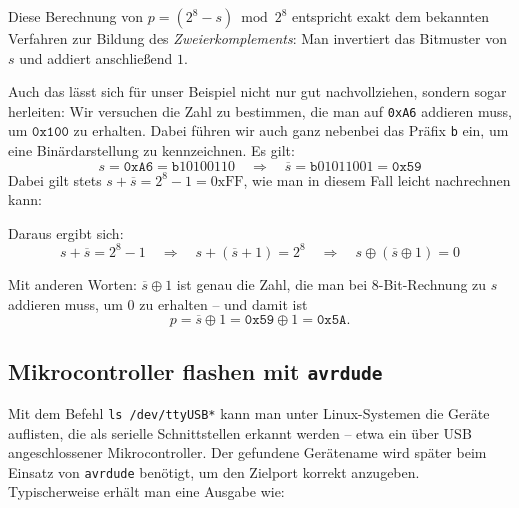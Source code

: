 \documentclass[a4paper,12pt]{article}
\begin{document}
\begin{enumerate}
	Diese Berechnung von $p = (2^8 - s) \bmod 2^8$ entspricht exakt dem
	bekannten Verfahren zur Bildung des \emph{Zweierkomplements}:  Man
	invertiert das Bitmuster von $s$ und addiert anschließend $1$.

	Auch das lässt sich für unser Beispiel nicht nur gut nachvollziehen,
	sondern sogar herleiten:  Wir versuchen die Zahl zu bestimmen, die man
	auf \texttt{0xA6} addieren muss, um  $\texttt{0x100}$ zu erhalten.
	Dabei führen wir auch ganz nebenbei das Präfix \texttt{b} ein, um eine
	Binärdarstellung zu kennzeichnen. Es gilt:
	\[
	    s = \texttt{0xA6} = \texttt{b}10100110
	    \quad\Rightarrow\quad
	    \overline{s} = \texttt{b}01011001 = \texttt{0x59}
	\]
	Dabei gilt stets $s + \overline{s} = 2^8 - 1 = \text{0xFF}$, wie man in
	diesem Fall leicht nachrechnen kann:
	\vspace{-0.2cm}
	\begin{center}
	\end{center}

	Daraus ergibt sich:
	\[
	    s + \overline{s} = 2^8 - 1
	    \quad\Rightarrow\quad
	    s + (\overline{s} + 1) = 2^8
	    \quad\Rightarrow\quad
	    s \oplus (\overline{s} \oplus 1) = 0
	\]

	Mit anderen Worten: $\overline{s} \oplus 1$ ist genau die Zahl, die man
	bei 8-Bit-Rechnung zu $s$ addieren muss, um $0$ zu erhalten – und damit
	ist
	\[
	    p = \overline{s} \oplus 1 = \texttt{0x59} \oplus 1 = \texttt{0x5A}.
	\]

\end{enumerate}


\subsection{Mikrocontroller flashen mit \texttt{avrdude}}
\label{sec:avrdude}

Mit dem Befehl \texttt{ls /dev/ttyUSB*} kann man unter Linux-Systemen die
Geräte auflisten, die als serielle Schnittstellen erkannt werden – etwa ein
über USB angeschlossener Mikrocontroller. Der gefundene Gerätename wird später
beim Einsatz von \texttt{avrdude} benötigt, um den Zielport korrekt anzugeben.
Typischerweise erhält man eine Ausgabe wie:
\end{document}
